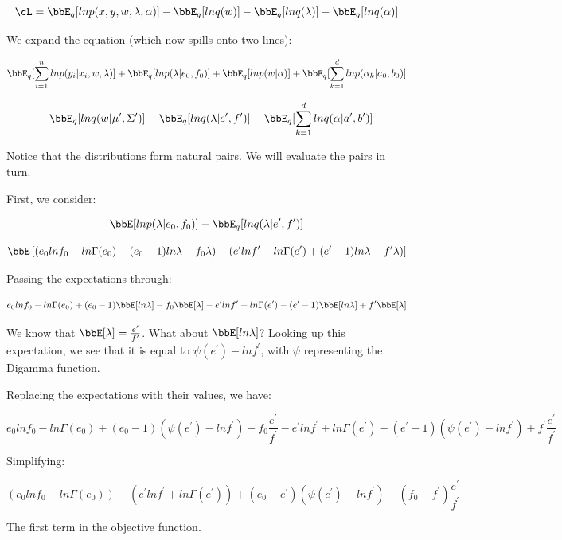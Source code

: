 \documentclass[twoside,11pt]{homework}
\begin{document}
\[
\cL =
\bbE_q [ln p(x,y,w, \lambda, \alpha) ]
- \bbE_q[lnq(w)]
- \bbE_q[lnq(\lambda)]
- \bbE_q[lnq(\alpha)]
\]

We expand the equation (which now spills onto two lines):

\[
\bbE_q [ \sum_{i=1}^n  ln p(y_i | x_i, w, \lambda)]
+ \bbE_q[ln p(\lambda | e_0, f_0)]
+ \bbE_q[ln p(w | \alpha)]
+ \bbE_q[ \sum_{k=1}^d ln p(\alpha_k | a_0, b_0)]
\]

\begin{equation}
- \bbE_q[lnq(w | \mu^\prime, \Sigma^\prime)]
- \bbE_q[lnq(\lambda | e^\prime, f^\prime)]
- \bbE_q[\sum_{k=1}^d lnq(\alpha | a^\prime, b^\prime)]
\end{equation}

Notice that the distributions form natural pairs. We will evaluate the pairs in turn.

First, we consider:

\[
\bbE[ ln p(\lambda | e_0, f_0)] - \bbE_q[lnq(\lambda | e^\prime, f^\prime)]
\]

\[
\bbE \Brackets{
(e_0lnf_0 - ln\Gamma(e_0) + (e_0 - 1)ln\lambda - f_0\lambda) -
(e^\prime lnf^\prime - ln\Gamma(e^\prime) + (e^\prime - 1)ln\lambda - f^\prime\lambda)
}
\]

Passing the expectations through:

\[
e_0lnf_0 - ln\Gamma(e_0) + (e_0 - 1)\bbE[ln\lambda] - f_0\bbE[\lambda] -
e^\prime lnf^\prime + ln\Gamma(e^\prime) - (e^\prime - 1)\bbE[ln\lambda] + f^\prime\bbE[\lambda]
\]

We know that $\bbE[\lambda] = \frac{e^\prime}{f^\prime}$. What about $\bbE[ln\lambda]$?
Looking up this expectation, we see that it is equal to $\psi(e^\prime) - lnf^\prime$, with $\psi$ representing the Digamma function.

Replacing the expectations with their values, we have:

\[
e_0lnf_0 - ln\Gamma(e_0) + (e_0 - 1)(\psi(e^\prime) - lnf^\prime) - f_0\frac{e^\prime}{f^\prime} -
e^\prime lnf^\prime + ln\Gamma(e^\prime) - (e^\prime - 1)(\psi(e^\prime) - lnf^\prime) + f^\prime\frac{e^\prime}{f^\prime}
\]

Simplifying:

\begin{equation}
(e_0lnf_0 - ln\Gamma(e_0)) - (e^\prime lnf^\prime + ln\Gamma(e^\prime))
+ (e_0 - e^\prime)(\psi(e^\prime) - lnf^\prime)
- (f_0 - f^\prime)\frac{e^\prime}{f^\prime}
\end{equation}

The first term in the objective function.
\end{document}
